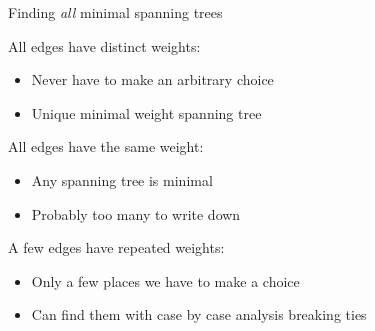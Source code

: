 \documentclass{beamer}
\begin{document}
  \begin{frame}{Finding \emph{all} minimal spanning trees}
    \begin{block}{All edges have distinct weights:}
      \begin{itemize}
        \item Never have to make an arbitrary choice
        \item      Unique minimal weight spanning tree
          \end{itemize}
    \end{block}
    \begin{block}{All edges have the same weight:}
      \begin{itemize}
        \item Any spanning tree is minimal 
        \item      Probably too many to write down
          \end{itemize}
    \end{block}
    \begin{block}{A few edges have repeated weights:}
      \begin{itemize} \item Only a few places we have to make a choice
      \item Can find them with case by case analysis breaking ties
      \end{itemize}
    \end{block}
    \end{frame}
  
\end{document}
